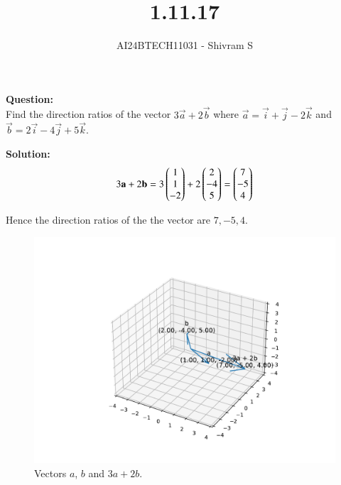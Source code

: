 \documentclass[journal]{IEEEtran}
\begin{document}

\vspace{3cm}

\title{1.11.17}
\author{AI24BTECH11031 - Shivram S
}
{\let\newpage\relax\maketitle}

\renewcommand{\thefigure}{\theenumi}
\renewcommand{\thetable}{\theenumi}
\setlength{\intextsep}{10pt} %


\renewcommand{\thetable}{\theenumi}


\textbf{Question: }\\
Find the direction ratios of the vector $3\vec{a} + 2\vec{b}$ where
$\vec{a} = \vec{i} + \vec{j} - 2\vec{k}$ and $\vec{b} = 2\vec{i} - 4\vec{j} + 5\vec{k}$.

\textbf{Solution: } \\

\begin{align}
3\mathbf{a} + 2\mathbf{b} = 3\begin{pmatrix}1 \\ 1 \\ -2\end{pmatrix} + 2\begin{pmatrix}2 \\ -4 \\ 5\end{pmatrix} = \begin{pmatrix}7 \\ -5 \\ 4\end{pmatrix}
\end{align}

Hence the direction ratios of the the vector are $7, -5, 4$.

\begin{figure}[h!]
    \centering
    \includegraphics[width=0.7\linewidth]{figs/fig.pdf}
    \caption{Vectors $a$, $b$ and $3a + 2b$.}
\end{figure}
\end{document}
